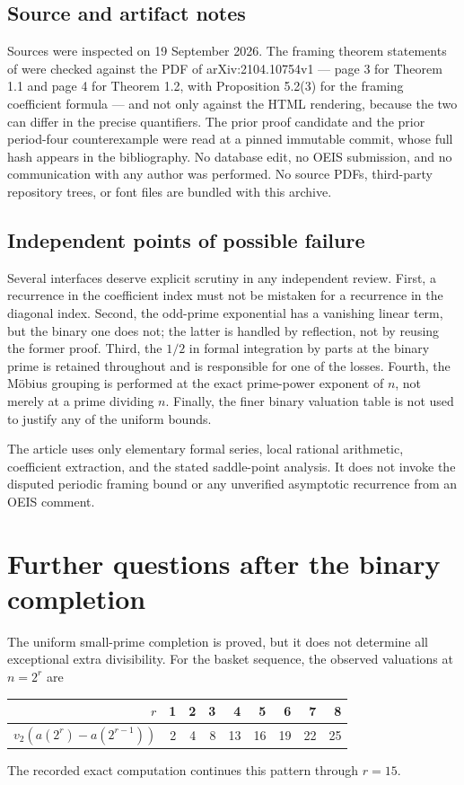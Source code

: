 \documentclass[11pt,a4paper]{article}
\numberwithin{equation}{section}
\theoremstyle{definition}
\theoremstyle{remark}
\begin{document}
\subsection{Source and artifact notes}
\label{sec:artifacts}
Sources were inspected on 19 September 2026. The framing theorem statements
of \cite{muller} were checked against the PDF of arXiv:2104.10754v1 --- page
3 for Theorem 1.1 and page 4 for Theorem 1.2, with Proposition 5.2(3) for
the framing coefficient formula --- and not only against the HTML rendering,
because the two can differ in the precise quantifiers. The prior proof
candidate and the prior period-four counterexample \cite{prior,priorcounter}
were read at a pinned immutable commit, whose full hash appears in the
bibliography. No database edit, no OEIS submission, and no communication
with any author was performed. No source PDFs, third-party repository trees,
or font files are bundled with this archive.

\subsection{Independent points of possible failure}
Several interfaces deserve explicit scrutiny in any independent review.
First, a recurrence in the coefficient index must not be mistaken for a
recurrence in the diagonal index. Second, the odd-prime exponential has a
vanishing linear term, but the binary one does not; the latter is handled
by reflection, not by reusing the former proof. Third, the $1/2$ in formal
integration by parts at the binary prime is retained throughout and is
responsible for one of the losses. Fourth, the Möbius grouping is performed
at the exact prime-power exponent of $n$, not merely at a prime dividing
$n$. Finally, the finer binary valuation table is not used to justify any
of the uniform bounds.

The article uses only elementary formal series, local rational arithmetic,
coefficient extraction, and the stated saddle-point analysis. It does not
invoke the disputed periodic framing bound or any unverified asymptotic
recurrence from an OEIS comment.

\section{Further questions after the binary completion}
\label{sec:frontiers}

The uniform small-prime completion is proved, but it does not determine
all exceptional extra divisibility. For the basket sequence, the observed
valuations at $n=2^r$ are
\begin{center}
\begin{tabular}{r r r r r r r r r}
\toprule
$r$&1&2&3&4&5&6&7&8\\
\midrule
$v_2(a(2^r)-a(2^{r-1}))$&2&4&8&13&16&19&22&25\\
\bottomrule
\end{tabular}
\end{center}
The recorded exact computation continues this pattern through $r=15$.
\end{document}
